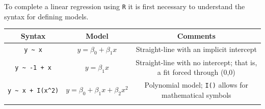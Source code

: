 \documentclass[]{article}
\numberwithin{equation}{section}
\begin{document}
To complete a linear regression using \texttt{R} it is first necessary
to understand the syntax for defining models.

\begin{longtable}[c]{@{}ccc@{}}
\toprule
\begin{minipage}[b]{0.27\columnwidth}\centering\strut
Syntax
\strut\end{minipage} &
\begin{minipage}[b]{0.55\columnwidth}\centering\strut
Model
\strut\end{minipage} &
\begin{minipage}[b]{0.90\columnwidth}\centering\strut
Comments
\strut\end{minipage}\tabularnewline
\midrule
\endhead
\begin{minipage}[t]{0.27\columnwidth}\centering\strut
\texttt{y\ \textasciitilde{}\ x}
\strut\end{minipage} &
\begin{minipage}[t]{0.55\columnwidth}\centering\strut
\(y = \beta_0+\beta_1x\)
\strut\end{minipage} &
\begin{minipage}[t]{0.90\columnwidth}\centering\strut
Straight-line with an implicit intercept
\strut\end{minipage}\tabularnewline
\begin{minipage}[t]{0.27\columnwidth}\centering\strut
\texttt{y\ \textasciitilde{}\ -1\ +\ x}
\strut\end{minipage} &
\begin{minipage}[t]{0.55\columnwidth}\centering\strut
\(y = \beta_1x\)
\strut\end{minipage} &
\begin{minipage}[t]{0.90\columnwidth}\centering\strut
Straight-line with no intercept; that is, a fit forced through (0,0)
\strut\end{minipage}\tabularnewline
\begin{minipage}[t]{0.27\columnwidth}\centering\strut
\texttt{y\ \textasciitilde{}\ x\ +\ I(x\^{}2)}
\strut\end{minipage} &
\begin{minipage}[t]{0.55\columnwidth}\centering\strut
\(y = \beta_0+\beta_1x+\beta_2x^2\)
\strut\end{minipage} &
\begin{minipage}[t]{0.90\columnwidth}\centering\strut
Polynomial model; \texttt{I()} allows for mathematical symbols
\strut\end{minipage}\tabularnewline
\begin{minipage}[t]{0.27\columnwidth}\centering\strut

\end{minipage}
\end{longtable}
\end{document}
